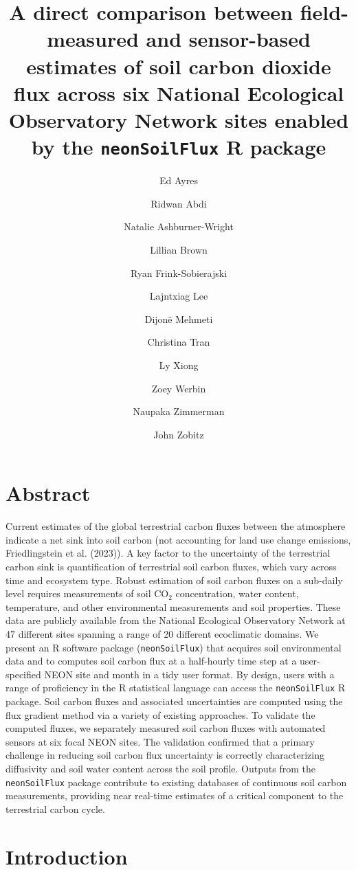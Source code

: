 \documentclass[
  letterpaper,
  DIV=11,
  numbers=noendperiod]{scrartcl}
\title{A direct comparison between field-measured and sensor-based
estimates of soil carbon dioxide flux across six National Ecological
Observatory Network sites enabled by the \texttt{neonSoilFlux} R
package}
\author{Ed Ayres \and Ridwan Abdi \and Natalie
Ashburner-Wright \and Lillian Brown \and Ryan
Frink-Sobierajski \and Lajntxiag Lee \and Dijonë Mehmeti \and Christina
Tran \and Ly Xiong \and Zoey Werbin \and Naupaka Zimmerman \and John
Zobitz}
\date{}
\begin{document}
\maketitle

\section{Abstract}\label{abstract}

Current estimates of the global terrestrial carbon fluxes between the
atmosphere indicate a net sink into soil carbon (not accounting for land
use change emissions, Friedlingstein et al. (2023)). A key factor to the
uncertainty of the terrestrial carbon sink is quantification of
terrestrial soil carbon fluxes, which vary across time and ecosystem
type. Robust estimation of soil carbon fluxes on a sub-daily level
requires measurements of soil CO\(_{2}\) concentration, water content,
temperature, and other environmental measurements and soil properties.
These data are publicly available from the National Ecological
Observatory Network at 47 different sites spanning a range of 20
different ecoclimatic domains. We present an R software package
(\texttt{neonSoilFlux}) that acquires soil environmental data and to
computes soil carbon flux at a half-hourly time step at a user-specified
NEON site and month in a tidy user format. By design, users with a range
of proficiency in the R statistical language can access the
\texttt{neonSoilFlux} R package. Soil carbon fluxes and associated
uncertainties are computed using the flux gradient method via a variety
of existing approaches. To validate the computed fluxes, we separately
measured soil carbon fluxes with automated sensors at six focal NEON
sites. The validation confirmed that a primary challenge in reducing
soil carbon flux uncertainty is correctly characterizing diffusivity and
soil water content across the soil profile. Outputs from the
\texttt{neonSoilFlux} package contribute to existing databases of
continuous soil carbon measurements, providing near real-time estimates
of a critical component to the terrestrial carbon cycle.

\section{Introduction}\label{introduction}
\end{document}
